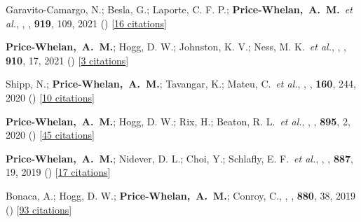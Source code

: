 \item[{\color{deemph}\scriptsize15}]Garavito-Camargo, N.; Besla, G.; Laporte, C. F. P.; \textbf{Price-Whelan,~A.~M.}~\textit{et al.}, , \apj, \textbf{919}, 109, 2021 () [\href{http://adsabs.harvard.edu/abs/2021ApJ...919..109G}{16 citations}]

\item[{\color{deemph}\scriptsize14}]\textbf{Price-Whelan,~A.~M.}; Hogg, D. W.; Johnston, K. V.; Ness, M. K.~\textit{et al.}, , \apj, \textbf{910}, 17, 2021 () [\href{http://adsabs.harvard.edu/abs/2021ApJ...910...17P}{3 citations}]

\item[{\color{deemph}\scriptsize13}]Shipp, N.; \textbf{Price-Whelan,~A.~M.}; Tavangar, K.; Mateu, C.~\textit{et al.}, , \aj, \textbf{160}, 244, 2020 () [\href{http://adsabs.harvard.edu/abs/2020AJ....160..244S}{10 citations}]

\item[{\color{deemph}\scriptsize12}]\textbf{Price-Whelan,~A.~M.}; Hogg, D. W.; Rix, H.; Beaton, R. L.~\textit{et al.}, , \apj, \textbf{895}, 2, 2020 () [\href{http://adsabs.harvard.edu/abs/2020ApJ...895....2P}{45 citations}]

\item[{\color{deemph}\scriptsize11}]\textbf{Price-Whelan,~A.~M.}; Nidever, D. L.; Choi, Y.; Schlafly, E. F.~\textit{et al.}, , \apj, \textbf{887}, 19, 2019 () [\href{http://adsabs.harvard.edu/abs/2019ApJ...887...19P}{17 citations}]

\item[{\color{deemph}\scriptsize10}]Bonaca, A.; Hogg, D. W.; \textbf{Price-Whelan,~A.~M.}; Conroy, C., , \apj, \textbf{880}, 38, 2019 () [\href{http://adsabs.harvard.edu/abs/2019ApJ...880...38B}{93 citations}]

